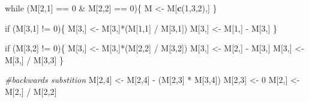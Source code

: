 \documentclass[]{article}
\newenvironment{Shaded}{\begin{snugshade}}{\end{snugshade}}
\newcommand{\KeywordTok}[1]{\textcolor[rgb]{0.13,0.29,0.53}{\textbf{{#1}}}}
\newcommand{\DecValTok}[1]{\textcolor[rgb]{0.00,0.00,0.81}{{#1}}}
\newcommand{\StringTok}[1]{\textcolor[rgb]{0.31,0.60,0.02}{{#1}}}
\newcommand{\CommentTok}[1]{\textcolor[rgb]{0.56,0.35,0.01}{\textit{{#1}}}}
\newcommand{\NormalTok}[1]{{#1}}
\begin{document}
\begin{Shaded}
\begin{Highlighting}[]
      \NormalTok{while (M[}\DecValTok{2}\NormalTok{,}\DecValTok{1}\NormalTok{] ==}\StringTok{ }\DecValTok{0} \NormalTok{&}\StringTok{ }\NormalTok{M[}\DecValTok{2}\NormalTok{,}\DecValTok{2}\NormalTok{] ==}\StringTok{ }\DecValTok{0}\NormalTok{)\{}
           \NormalTok{M <-}\StringTok{ }\NormalTok{M[}\KeywordTok{c}\NormalTok{(}\DecValTok{1}\NormalTok{,}\DecValTok{3}\NormalTok{,}\DecValTok{2}\NormalTok{),]}
      \NormalTok{\}}
      
      \NormalTok{if (M[}\DecValTok{3}\NormalTok{,}\DecValTok{1}\NormalTok{] !=}\StringTok{ }\DecValTok{0}\NormalTok{)\{}
          \NormalTok{M[}\DecValTok{3}\NormalTok{,] <-}\StringTok{ }\NormalTok{M[}\DecValTok{3}\NormalTok{,]*(M[}\DecValTok{1}\NormalTok{,}\DecValTok{1}\NormalTok{] /}\StringTok{ }\NormalTok{M[}\DecValTok{3}\NormalTok{,}\DecValTok{1}\NormalTok{]) }
          \NormalTok{M[}\DecValTok{3}\NormalTok{,] <-}\StringTok{ }\NormalTok{M[}\DecValTok{1}\NormalTok{,] -}\StringTok{ }\NormalTok{M[}\DecValTok{3}\NormalTok{,]}
      \NormalTok{\}}
      
      \NormalTok{if (M[}\DecValTok{3}\NormalTok{,}\DecValTok{2}\NormalTok{] !=}\StringTok{ }\DecValTok{0}\NormalTok{)\{}
        \NormalTok{M[}\DecValTok{3}\NormalTok{,] <-}\StringTok{ }\NormalTok{M[}\DecValTok{3}\NormalTok{,]*(M[}\DecValTok{2}\NormalTok{,}\DecValTok{2}\NormalTok{] /}\StringTok{ }\NormalTok{M[}\DecValTok{3}\NormalTok{,}\DecValTok{2}\NormalTok{]) }
        \NormalTok{M[}\DecValTok{3}\NormalTok{,] <-}\StringTok{ }\NormalTok{M[}\DecValTok{2}\NormalTok{,] -}\StringTok{ }\NormalTok{M[}\DecValTok{3}\NormalTok{,]}
        \NormalTok{M[}\DecValTok{3}\NormalTok{,] <-}\StringTok{ }\NormalTok{M[}\DecValTok{3}\NormalTok{,] /}\StringTok{ }\NormalTok{M[}\DecValTok{3}\NormalTok{,}\DecValTok{3}\NormalTok{]}
      \NormalTok{\}}
      
     \CommentTok{#backwards substition}
     \NormalTok{M[}\DecValTok{2}\NormalTok{,}\DecValTok{4}\NormalTok{] <-}\StringTok{ }\NormalTok{M[}\DecValTok{2}\NormalTok{,}\DecValTok{4}\NormalTok{] -}\StringTok{ }\NormalTok{(M[}\DecValTok{2}\NormalTok{,}\DecValTok{3}\NormalTok{] *}\StringTok{ }\NormalTok{M[}\DecValTok{3}\NormalTok{,}\DecValTok{4}\NormalTok{])}
     \NormalTok{M[}\DecValTok{2}\NormalTok{,}\DecValTok{3}\NormalTok{] <-}\StringTok{ }\DecValTok{0}
     \NormalTok{M[}\DecValTok{2}\NormalTok{,] <-}\StringTok{ }\NormalTok{M[}\DecValTok{2}\NormalTok{,] /}\StringTok{ }\NormalTok{M[}\DecValTok{2}\NormalTok{,}\DecValTok{2}\NormalTok{]}
     

\end{Highlighting}
\end{Shaded}
\end{document}
